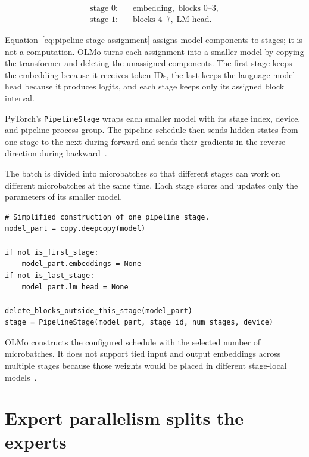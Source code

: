 \documentclass[11pt]{article}
\begin{document}
\begin{equation}
\begin{split}
\text{stage 0}:&\quad \text{embedding},\;\text{blocks }0\text{--}3,\\
\text{stage 1}:&\quad \text{blocks }4\text{--}7,\;\text{LM head}.
\end{split}
\label{eq:pipeline-stage-assignment}
\end{equation}

Equation~\eqref{eq:pipeline-stage-assignment} assigns model components to
stages; it is not a computation. OLMo turns each assignment into a smaller
model by copying the transformer and deleting the unassigned components. The
first stage keeps the embedding because it receives token IDs, the last keeps
the language-model head because it produces logits, and each stage keeps only
its assigned block interval.

PyTorch's \texttt{PipelineStage} wraps each smaller model with its stage index,
device, and pipeline process group. The pipeline schedule then sends hidden
states from one stage to the next during forward and sends their gradients in
the reverse direction during backward~\cite{olmo-pipeline-config}.

The batch is divided into microbatches so that different stages can work on
different microbatches at the same time. Each stage stores and updates only
the parameters of its smaller model.

\begin{lstlisting}[basicstyle=\ttfamily\footnotesize]
# Simplified construction of one pipeline stage.
model_part = copy.deepcopy(model)

if not is_first_stage:
    model_part.embeddings = None
if not is_last_stage:
    model_part.lm_head = None

delete_blocks_outside_this_stage(model_part)
stage = PipelineStage(model_part, stage_id, num_stages, device)
\end{lstlisting}

OLMo constructs the configured schedule with the selected number of
microbatches. It does not support tied input and output embeddings across
multiple stages because those weights would be placed in different stage-local
models~\cite{olmo-pipeline-train,olmo-pipeline-config}.

\newpage
\section{Expert parallelism splits the experts}
\end{document}
